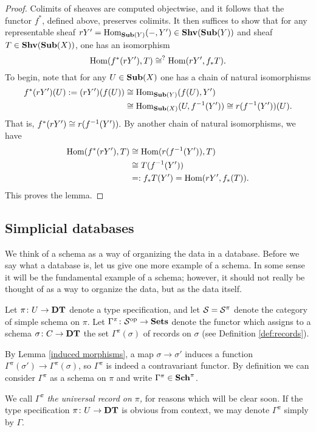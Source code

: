 \documentclass{amsart}
\begin{document}
\begin{proof}

Colimits of sheaves are computed objectwise, and it follows that the functor $f^*$, defined above, preserves colimits.  It then suffices to show that for any representable sheaf $rY'=\textnormal{Hom}_{{\bf Sub}(Y)}(-,Y')\in{\bf Shv}({\bf Sub}(Y))$ and sheaf $T\in{\bf Shv}({\bf Sub}(X))$, one has an isomorphism $$\textnormal{Hom}(f^*(rY'),T)\cong^?\textnormal{Hom}(rY',f_*T).$$  To begin, note that for any $U\in{\bf Sub}(X)$ one has a chain of natural isomorphisms \begin{align*}f^*(rY')(U):=(rY')(f(U))&\iso\Hom_{\Sub(Y)}(f(U),Y')\\&\iso\Hom_{\Sub(X)}(U,f^\m1(Y'))\iso r(f^\m1(Y'))(U).\end{align*}  That is, $f^*(rY')\iso r(f^\m1(Y')).$  By another chain of natural isomorphisms, we have \begin{align*}\Hom(f^*(rY'),T)&\iso\Hom(r(f^\m1(Y')),T)\\&\iso T(f^\m1(Y'))\\&=:f_*T(Y')=\Hom(rY',f_*(T)).\end{align*}  This proves the lemma.

\end{proof}

\subsection{Simplicial databases}

We think of a schema as a way of organizing the data in a database.  Before we say what a database is, let us give one more example of a schema.  In some sense it will be the fundamental example of a schema; however, it should not really be thought of as a way to organize the data, but as the data itself.

\begin{example}\label{ex:universal record}

Let $\pi\colon U\rightarrow{\bf DT}$ denote a type specification, and let $\mathcal{S}=\mathcal{S}^\pi$ denote the category of simple schema on $\pi$.  Let $\Gamma^\pi\colon\mathcal{S}^\textnormal{op}\rightarrow{\bf Sets}$ denote the functor which assigns to a schema $\sigma\colon C\rightarrow{\bf DT}$ the set $\Gamma^\pi(\sigma)$ of records on $\sigma$ (see Definition \ref{def:records}).

By Lemma \ref{induced morphisms}, a map $\sigma\to\sigma'$ induces a function $\Gamma^\pi(\sigma')\to\Gamma^\pi(\sigma)$, so $\Gamma^\pi$ is indeed a contravariant functor.  By definition we can consider $\Gamma^\pi$ as a schema on $\pi$ and write $\Gamma^\pi\in{\bf Sch}^\pi$.

We call $\Gamma^\pi$ {\em the universal record on $\pi$,} for reasons which will be clear soon.  If the type specification $\pi\colon U\rightarrow{\bf DT}$ is obvious from context, we may denote $\Gamma^\pi$ simply by $\Gamma$.  

\end{example}
\end{document}
